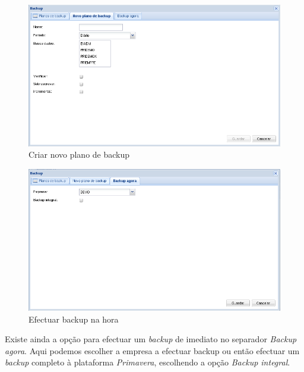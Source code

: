 \begin{figure}[H]
    \begin{center}
    \includegraphics[scale=0.38]{screenshots/primavera/primaverainterface_03.png}
    \caption{Criar novo plano de backup}
    \label{fig:primavera_new_backup_plan}
    \end{center}
\end{figure}

\begin{figure}[H]
    \begin{center}
    \includegraphics[scale=0.38]{screenshots/primavera/primaverainterface_04.png}
    \caption{Efectuar backup na hora}
    \label{fig:primavera_backup_now}
    \end{center}
\end{figure}

Existe ainda a opção para efectuar um \textit{backup} de imediato no separador \textit{Backup agora}. 
Aqui podemos escolher a empresa a efectuar backup ou então efectuar um \textit{backup} completo à plataforma \textit{Primavera}, escolhendo a opção \textit{Backup integral}.

